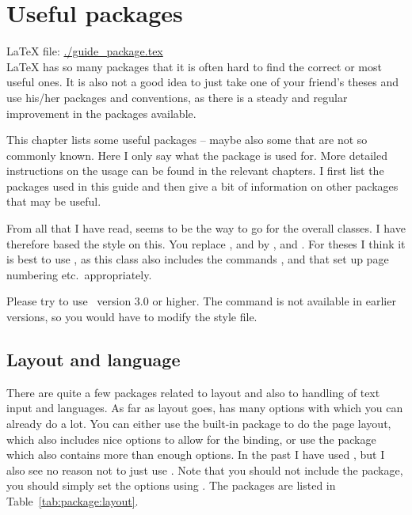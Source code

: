 \chapter{Useful packages}
\label{sec:package}

\LaTeX{} file: \url{./guide_package.tex}\\[1ex]
\noindent
\LaTeX{} has so many packages that it is often hard to find the
correct or most useful ones. It is also not a good idea to just take
one of your friend's theses and use his/her packages and conventions,
as there is a steady and regular improvement in the packages
available.

This chapter lists some useful packages -- maybe also some that
are not so commonly known. Here I only say what the package is used
for. More detailed instructions on the usage can be found in the
relevant chapters. I first list the packages used in this guide
and then give a bit of information on other packages that may be useful.

From all that I have read, \KOMAScript{}
seems to be the way to go for the overall classes. I have therefore
based the  style on this. You replace
,  and  by
,  and . For
theses I think it is best to use , as this class also
includes the commands ,  and
 that set up page numbering etc.\ appropriately.

Please try to use \KOMAScript\ version 3.0 or higher. The
 command is not available in earlier versions, so
you would have to modify the style file.


\section{Layout and language}
\label{sec:package:layout}

There are quite a few packages related to layout and also to handling
of text input and languages. As far as layout goes, \KOMAScript{} has
many options with which you can already do a lot. You can either use
the built-in  package to do the page layout, which
also includes nice options to allow for the binding, or use the
 package which also contains more than enough
options. In the past I have used , but I also see no
reason not to just use . Note that you should not
include the  package, you should simply set the
options using .
The packages are listed in Table~\ref{tab:package:layout}.

